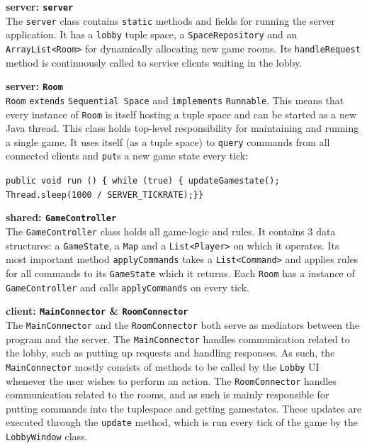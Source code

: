 \textbf{server: \texttt{server}}\\
The \texttt{server} class contains \texttt{static} methods and fields for running the server application. It has a \texttt{lobby} tuple space, a \texttt{SpaceRepository} and an \texttt{ArrayList<Room>} for dynamically allocating new game rooms. Its \texttt{handleRequest} method is continuously called to service clients waiting in the lobby. 

\textbf{server: \texttt{Room}}\\
\texttt{Room} \texttt{extends} \texttt{Sequential Space} and \texttt{implements} \texttt{Runnable}. This means that every instance of \texttt{Room} is itself hosting a tuple space and can be started as a new Java thread. This class holds top-level responsibility for maintaining and running a single game. It uses itself (as a tuple space) to \texttt{query} commands from all connected clients and \texttt{put}s a new game state every tick:
\vspace{-0.5cm}
\begin{center}
    \texttt{public void run () \{ while (true) \{ updateGamestate(); Thread.sleep(1000 / SERVER\_TICKRATE);\}\}}
\end{center}

\textbf{shared: \texttt{GameController}}\\
The \texttt{GameController} class holds all game-logic and rules. It contains 3 data structures: a \texttt{GameState}, a \texttt{Map} and a \texttt{List<Player>} on which it operates. Its most important method \texttt{applyCommands} takes a \texttt{List<Command>} and applies rules for all commands to its \texttt{GameState} which it returns. Each \texttt{Room} has a instance of \texttt{GameController} and calls \texttt{applyCommands} on every tick.  

\textbf{client: \texttt{MainConnector} \& \texttt{RoomConnector}}\\
The \texttt{MainConnector} and the \texttt{RoomConnector} both serve as mediators between the program and the server. The \texttt{MainConnector} handles communication related to the lobby, such as putting up requests and handling responses. As such, the \texttt{MainConnector} mostly consists of methods to be called by the \texttt{Lobby} UI whenever the user wishes to perform an action. The \texttt{RoomConnector} handles communication related to the rooms, and as such is mainly responsible for putting commands into the tuplespace and getting gamestates. These updates are executed through the \texttt{update} method, which is run every tick of the game by the \texttt{LobbyWindow} class.


